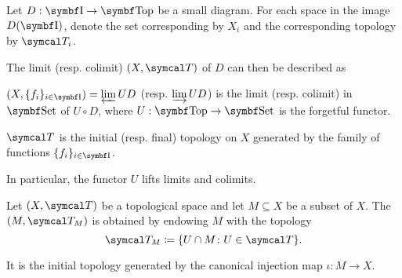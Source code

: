 \begin{proposition}\label{thm:initial_final_topology_limit}\cite{nLab:top}
  Let \( D: \Bold I \to \Cat{Top} \) be a small diagram. For each space in the image \( D(\Bold I) \), denote the set corresponding by \( X_i \) and the corresponding topology by \( \Cal{T}_i \).

  The limit (resp. colimit) \( (X, \Cal{T}) \) of \( D \) can then be described as
  \begin{defenum}
    \item \( (X, \{ f_i \}_{i \in \Cat{I}}) = \varprojlim UD \) (resp. \( \varinjlim UD \)) is the limit (resp. colimit) in \( \Bold{Set} \) of \( U \circ D \), where \( U: \Bold{Top} \to \Bold{Set} \) is the forgetful functor.
    \item \( \Cal{T} \) is the initial (resp. final) topology on \( X \) generated by the family of functions \( \{ f_i \}_{i \in \Cat{I}} \).
  \end{defenum}

  In particular, the functor \( U \) lifts limits and colimits.
\end{proposition}

\begin{definition}\label{def:topological_subspace}
  Let \( (X, \Cal{T}) \) be a topological space and let \( M \subseteq X \) be a subset of \( X \). The  \( (M, \Cal{T}_M) \) is obtained by endowing \( M \) with the topology
  \begin{equation*}
    \Cal{T}_M \coloneqq \{ U \cap M \colon U \in \Cal{T} \}.
  \end{equation*}

  It is the initial topology generated by the canonical injection map \( \iota: M \to X \).
\end{definition}

